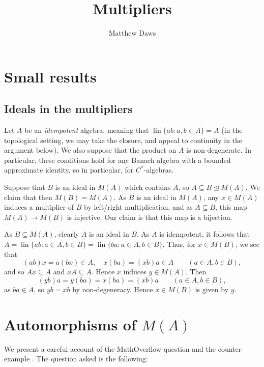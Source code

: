 \documentclass[a4paper,12pt]{article}
\theoremstyle{plain}
\theoremstyle{definition}
\newcommand{\lin}{\operatorname{lin}}
\begin{document}
\title{Multipliers}
\author{Matthew Daws}
\maketitle

\tableofcontents

\section{Small results}


\subsection{Ideals in the multipliers}\label{sec:ideals_in_mults}

Let $A$ be an \emph{idempotent} algebra, meaning that $\lin\{ ab : a,b\in A \} = A$ (in the topological setting,
we may take the closure, and appeal to continuity in the argument below).
We also suppose that the product on $A$ is non-degenerate.
In particular, these conditions hold for any Banach algebra with a bounded approximate identity,
so in particular, for $C^*$-algebras.  

Suppose that $B$ is an ideal in $M(A)$ which contains $A$, so $A\subseteq B \unlhd M(A)$.
We claim that then $M(B) = M(A)$.  As $B$ is an ideal in $M(A)$, any $x\in M(A)$ induces a multiplier
of $B$ by left/right multiplication, and as $A\subseteq B$, this map $M(A)\rightarrow M(B)$ is
injective.  Our claim is that this map is a bijection.

As $B\subseteq M(A)$, clearly $A$ is an ideal in $B$.  As $A$ is idempotent, it follows that
$A = \lin \{ ab : a\in A, b\in B\} = \lin \{ ba : a\in A, b\in B \}$.  Thus, for $x\in M(B)$, we see that
\[ (ab)x = a(bx) \in A, \quad x(ba) = (xb)a \in A \qquad (a\in A, b\in B), \]
and so $Ax \subseteq A$ and $xA\subseteq A$.  Hence $x$ induces $y\in M(A)$.  Then
\[ (yb)a = y(ba) = x(ba) = (xb)a \qquad (a\in A, b\in B), \]
as $ba\in A$, so $yb = xb$ by non-degeneracy.  Hence $x\in M(B)$ is given by $y$.



\section{Automorphisms of $M(A)$}\label{sec:auts}

We present a careful account of the MathOverflow question \cite{qs} and the counter-example \cite{ds}.
The question asked is the following:
\end{document}
